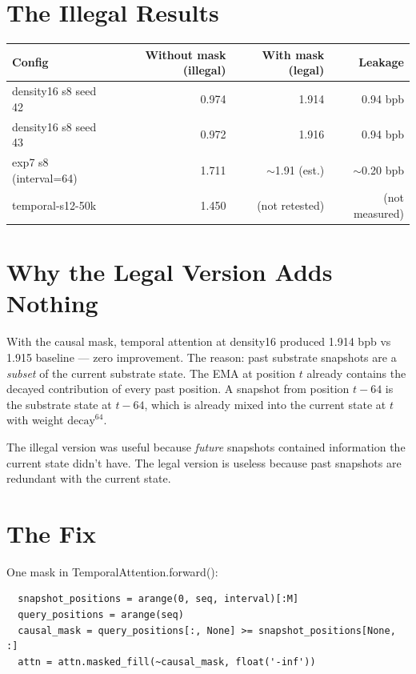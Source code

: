 \documentclass[11pt,a4paper]{report}
\begin{document}
\section{The Illegal Results}

\begin{table}[h]
\centering
\begin{tabular}{lrrr}
\toprule
\textbf{Config} & \textbf{Without mask (illegal)} & \textbf{With mask (legal)} & \textbf{Leakage} \\
\midrule
density16 s8 seed 42 & 0.974 & 1.914 & 0.94 bpb \\
density16 s8 seed 43 & 0.972 & 1.916 & 0.94 bpb \\
exp7 s8 (interval=64) & 1.711 & $\sim$1.91 (est.) & $\sim$0.20 bpb \\
temporal-s12-50k & 1.450 & (not retested) & (not measured) \\
\bottomrule
\end{tabular}
\end{table}

\section{Why the Legal Version Adds Nothing}

With the causal mask, temporal attention at density16 produced 1.914 bpb vs 1.915 baseline --- zero improvement. The reason: past substrate snapshots are a \emph{subset} of the current substrate state. The EMA at position $t$ already contains the decayed contribution of every past position. A snapshot from position $t-64$ is the substrate state at $t-64$, which is already mixed into the current state at $t$ with weight $\text{decay}^{64}$.

The illegal version was useful because \emph{future} snapshots contained information the current state didn't have. The legal version is useless because past snapshots are redundant with the current state.

\section{The Fix}

One mask in TemporalAttention.forward():

\begin{verbatim}
  snapshot_positions = arange(0, seq, interval)[:M]
  query_positions = arange(seq)
  causal_mask = query_positions[:, None] >= snapshot_positions[None, :]
  attn = attn.masked_fill(~causal_mask, float('-inf'))
\end{verbatim}
\end{document}
